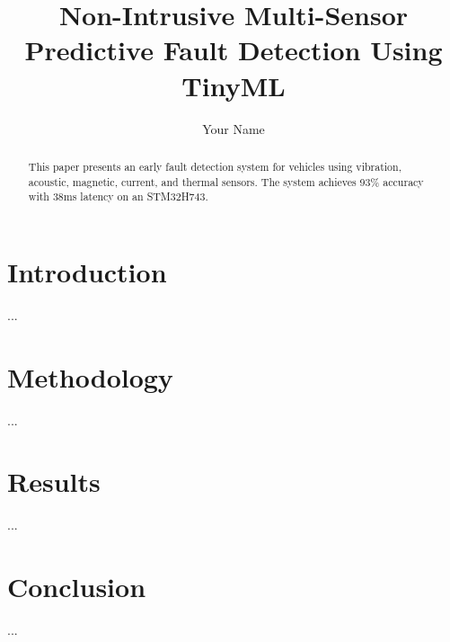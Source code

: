 \documentclass[twocolumn]{article}
\begin{document}
\title{Non-Intrusive Multi-Sensor Predictive Fault Detection Using TinyML}
\author{Your Name}
\maketitle

\begin{abstract}
This paper presents an early fault detection system for vehicles using vibration, acoustic, magnetic, current, and thermal sensors. The system achieves 93\% accuracy with 38ms latency on an STM32H743.
\end{abstract}

\section{Introduction}
...

\section{Methodology}
...

\section{Results}
...

\section{Conclusion}
...
\end{document}
